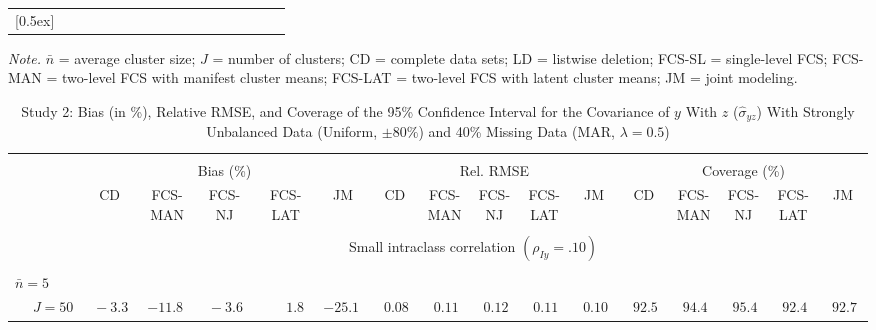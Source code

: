 \begin{sidewaystable}
\begin{threeparttable}
\begin{tabular}{llccccccccccccccc}
[0.5ex]\hline\\[-1.6ex] 
\end{tabular}
\begin{tablenotes}{\footnotesize \textit{Note.} $\bar{n}$ = average cluster size; $J$ = number of clusters; CD = complete data sets; LD = listwise deletion; FCS-SL = single-level FCS; FCS-MAN = two-level FCS with manifest cluster means; FCS-LAT = two-level FCS with latent cluster means; JM = joint modeling.}\end{tablenotes}
\end{threeparttable}
\end{sidewaystable}
\begin{sidewaystable}
\begin{threeparttable}
\setlength{\tabcolsep}{1.0pt}
\renewcommand{\arraystretch}{0.95}
\footnotesize
\caption{\small Study 2: Bias (in \%), Relative RMSE, and Coverage of the 95\% Confidence Interval for the Covariance of $y$ With $z$ ($\hat\sigma_{yz}$) With Strongly Unbalanced Data (Uniform, $\pm 80\%$) and 40\% Missing Data (MAR, $\lambda=0.5$)}
\begin{tabular}{llccccccccccccccc}
\hline\\[-1.8ex]
& & \multicolumn{5}{c}{Bias (\%)} & \multicolumn{5}{c}{Rel. RMSE} & \multicolumn{5}{c}{Coverage (\%)} \\ \cmidrule(r){3-7}\cmidrule(r){8-12}\cmidrule(r){13-17}
 &  & CD & \makecell{FCS-\\MAN} & \makecell{FCS-\\NJ} & \makecell{FCS-\\LAT} & JM & CD & \makecell{FCS-\\MAN} & \makecell{FCS-\\NJ} & \makecell{FCS-\\LAT} & JM & CD & \makecell{FCS-\\MAN} & \makecell{FCS-\\NJ} & \makecell{FCS-\\LAT} & \multicolumn{1}{c}{JM} \\ 
[0.4ex]\hline\\[-1.8ex]
& & \multicolumn{15}{c}{Small intraclass correlation $(\rho_{Iy}=.10)$} \\[0.6ex]\hline\\[-1.8ex]
\multicolumn{4}{l}{$\bar{n}=5$} \\  & \nopagebreak $\;J=50$  & $\phantom{0}{-}3.3\phantom{0}$ & ${-}11.8\phantom{0}$ & $\phantom{0}{-}3.6\phantom{0}$ & $\phantom{0}\phantom{-}1.8\phantom{0}$ & ${-}25.1\phantom{0}$ & $\phantom{0}0.08\phantom{0}$ & $\phantom{0}0.11\phantom{0}$ & $\phantom{0}0.12\phantom{0}$ & $\phantom{0}0.11\phantom{0}$ & $\phantom{0}0.10\phantom{0}$ & $\phantom{0}92.5\phantom{0}$ & $\phantom{0}94.4\phantom{0}$ & $\phantom{0}95.4\phantom{0}$ & $\phantom{0}92.4\phantom{0}$ & $\phantom{0}92.7\phantom{0}$ \\

\end{tabular}
\end{threeparttable}
\end{sidewaystable}
